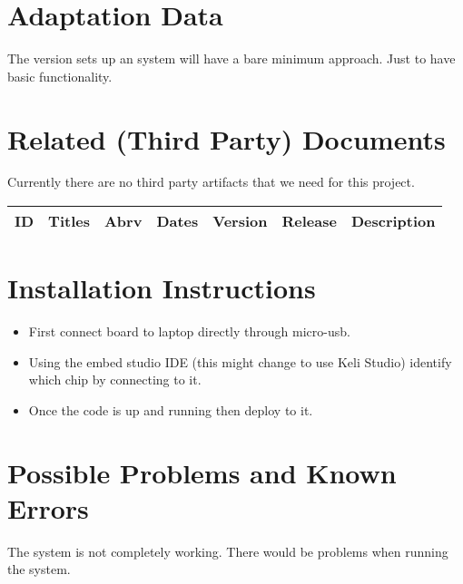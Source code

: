\section{Adaptation Data}
\label{loc:AdaptationData}
% 

The version sets up an system will have a bare minimum approach. Just to have basic functionality. 

\section{Related (Third Party) Documents}
\label{loc:RelatedDocuments}
% 

Currently there are no third party artifacts that we need for this project.
\begin{center}
\begin{tabular}{|| c c c c c c c ||}
\hline
 ID & Titles & Abrv & Dates & Version & Release & Description\\
\hline 
\hline
\hline
\end{tabular}
\end{center}

\section{Installation Instructions}
\label{loc:InstallationInstructions}
% 
\begin{itemize}
    \item First connect board to laptop directly through micro-usb. 
    \item Using the embed studio IDE (this might change to use Keli Studio) identify which chip by connecting to it. 
    \item Once the code is up and running then deploy to it.
\end{itemize}

\section{Possible Problems and Known Errors}
\label{loc:PossibleProblemsAndKnownErrors}
% 
The system is not completely working. There would be problems when running the system.